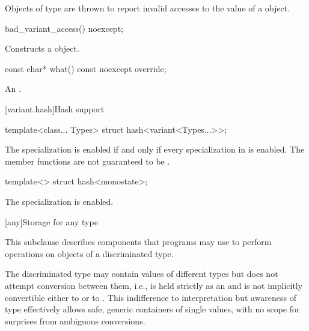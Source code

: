\pnum
Objects of type  are thrown to report invalid
accesses to the value of a  object.

%
\begin{itemdecl}
bad_variant_access() noexcept;
\end{itemdecl}

\begin{itemdescr}
\pnum
Constructs a  object.
\end{itemdescr}

%
\begin{itemdecl}
const char* what() const noexcept override;
\end{itemdecl}

\begin{itemdescr}
\pnum
\returns An  \ntbs{}.
\end{itemdescr}

[variant.hash]{Hash support}

%
\begin{itemdecl}
template<class... Types> struct hash<variant<Types...>>;
\end{itemdecl}

\begin{itemdescr}
\pnum
The specialization  is enabled
if and only if every specialization in  is enabled.
The member functions are not guaranteed to be .
\end{itemdescr}

%
\begin{itemdecl}
template<> struct hash<monostate>;
\end{itemdecl}

\begin{itemdescr}
\pnum
The specialization is enabled.
\end{itemdescr}


[any]{Storage for any type}

\pnum
This subclause describes components that \Cpp{} programs may use to perform operations on objects of a discriminated type.

\pnum
\begin{note}
The discriminated type may contain values of different types but does not attempt conversion between them,
i.e.,  is held strictly as an  and is not implicitly convertible either to  or to .
This indifference to interpretation but awareness of type effectively allows safe, generic containers of single values, with no scope for surprises from ambiguous conversions.
\end{note}

